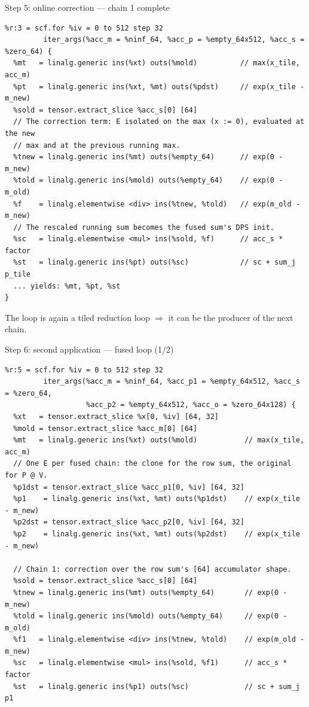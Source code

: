 \documentclass[10pt, aspectratio=169]{beamer}
\begin{document}
\begin{frame}[fragile]{Step 5: online correction --- chain 1 complete}
\begin{lstlisting}
%r:3 = scf.for %iv = 0 to 512 step 32
         iter_args(%acc_m = %ninf_64, %acc_p = %empty_64x512, %acc_s = %zero_64) {
  %mt   = linalg.generic ins(%xt) outs(%mold)          // max(x_tile, acc_m)
  %pt   = linalg.generic ins(%xt, %mt) outs(%pdst)     // exp(x_tile - m_new)
  %sold = tensor.extract_slice %acc_s[0] [64]
  // The correction term: E isolated on the max (x := 0), evaluated at the new
  // max and at the previous running max.
  %tnew = linalg.generic ins(%mt) outs(%empty_64)      // exp(0 - m_new)
  %told = linalg.generic ins(%mold) outs(%empty_64)    // exp(0 - m_old)
  %f    = linalg.elementwise <div> ins(%tnew, %told)   // exp(m_old - m_new)
  // The rescaled running sum becomes the fused sum's DPS init.
  %sc   = linalg.elementwise <mul> ins(%sold, %f)      // acc_s * factor
  %st   = linalg.generic ins(%pt) outs(%sc)            // sc + sum_j p_tile
  ... yields: %mt, %pt, %st
}
\end{lstlisting}
  \small The loop is again a tiled reduction loop $\Rightarrow$ it can be the
  producer of the next chain.
\end{frame}

\begin{frame}[fragile]{Step 6: second application --- fused loop (1/2)}
\begin{lstlisting}
%r:5 = scf.for %iv = 0 to 512 step 32
         iter_args(%acc_m = %ninf_64, %acc_p1 = %empty_64x512, %acc_s = %zero_64,
                   %acc_p2 = %empty_64x512, %acc_o = %zero_64x128) {
  %xt   = tensor.extract_slice %x[0, %iv] [64, 32]
  %mold = tensor.extract_slice %acc_m[0] [64]
  %mt   = linalg.generic ins(%xt) outs(%mold)           // max(x_tile, acc_m)
  // One E per fused chain: the clone for the row sum, the original for P @ V.
  %p1dst = tensor.extract_slice %acc_p1[0, %iv] [64, 32]
  %p1    = linalg.generic ins(%xt, %mt) outs(%p1dst)    // exp(x_tile - m_new)
  %p2dst = tensor.extract_slice %acc_p2[0, %iv] [64, 32]
  %p2    = linalg.generic ins(%xt, %mt) outs(%p2dst)    // exp(x_tile - m_new)

  // Chain 1: correction over the row sum's [64] accumulator shape.
  %sold = tensor.extract_slice %acc_s[0] [64]
  %tnew = linalg.generic ins(%mt) outs(%empty_64)       // exp(0 - m_new)
  %told = linalg.generic ins(%mold) outs(%empty_64)     // exp(0 - m_old)
  %f1   = linalg.elementwise <div> ins(%tnew, %told)    // exp(m_old - m_new)
  %sc   = linalg.elementwise <mul> ins(%sold, %f1)      // acc_s * factor
  %st   = linalg.generic ins(%p1) outs(%sc)             // sc + sum_j p1
\end{lstlisting}
\end{frame}
\end{document}
